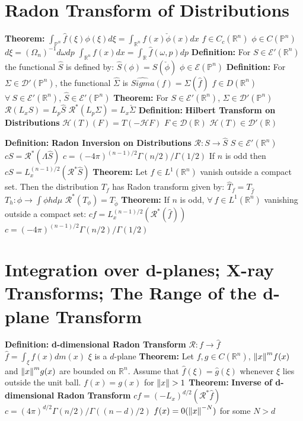 \documentclass[14pt]{extarticle}
\def\Definition{{\color{blue} \textbf{Definition:} }}
\def\Theorem{{\color{red} \textbf{Theorem:} }}
\begin{document}
\begin{outline}
	\section*{Radon Transform of Distributions}
		\1	\Theorem $\int_{\mathbb{P}^n}\hat{f}(\xi)\phi(\xi) d\xi =
				\int_{\mathbb{R}^n} f(x) \check{\phi}(x) dx$
			\2	$f \in C_c(\mathbb{R}^n)$
			\2	$\phi \in C(\mathbb{P}^n)$
			\2	$d\xi = (\Omega_n)^{-1} d\omega dp$ 
			\2	$\int_{\mathbb{R}^n} f(x) dx = \int_{\mathbb{R}} \hat{f}(\omega,p)dp$
		\1	\Definition For $S \in \mathcal{E}'(\mathbb{R}^n)$ the functional
				$\hat{S}$ is defined by:
			\2	$\hat{S}(\phi) = S(\check{\phi})$
				\3	$\phi \in \mathcal{E}(\mathbb{P}^n)$
		\1 \Definition 	For $\Sigma \in \mathcal{D}'(\mathbb{P}^n)$, the functional
				$\hat{\Sigma}$ is
			\2	$\hat{Sigma}(f) = \Sigma(\hat{f})$
				\3	$f \in D(\mathbb{R}^n)$
			\2	$\forall~S \in \mathcal{E}'(\mathbb{R}^n)$, $\hat{S} \in \mathcal{E}'(\mathbb{P}^n)$
		\1	\Theorem For $S \in \mathcal{E}'(\mathbb{R}^n)$, $\Sigma \in \mathcal{D}'(\mathbb{P}^n)$
			\2	$\mathcal{R}(L_xS) = L_p \hat{S}$
			\2	$\mathcal{R}^*(L_p\Sigma) = L_x \check{\Sigma}$
		\1	\Definition \textbf{Hilbert Transform on Distributions}
			\2	$\mathcal{H}(T)(F) = T(-\mathcal{H}F)$
				\3	$F \in \mathcal{D}(\mathbb{R})$
				\3	$\mathcal{H}(T) \in \mathcal{D}'(\mathbb{R})$

		\1	\Definition \textbf{Radon Inversion on Distributions}
			\2	$\mathcal{R} : S \rightarrow \hat{S}$
				\3	$S \in \mathcal{E}'(\mathbb{R}^n)$
			\2	$cS = \mathcal{R}^*(\Lambda \hat{S})$
				\3	$c = (-4\pi)^{(n-1)/2}\Gamma(n/2)/\Gamma(1/2)$
			\2	If $n$ is odd then $cS = L_x^{(n-1)/2}(\mathcal{R}^* \hat{S})$
		\1	\Theorem Let $f \in L^1(\mathbb{R}^n)$ vanish outside a compact set.
				Then the distribution $T_f$ has Radon transform given by:
			\2	$\hat{T}_f = T_{\hat{f}}$
			\2	$T_h : \phi \rightarrow \int \phi h d\mu$
			\2	$\mathcal{R}^*(T_{\phi}) = T_{\check{\phi}}$
		\1	\Theorem If $n$ is odd, $\forall~f \in L^1(\mathbb{R}^n)$ vanishing outside
				a compact set:
			\2	$c f = L_x^{(n-1)/2}(\mathcal{R}^*(\hat{f}))$
				\3	$c = (-4\pi)^{(n-1)/2}\Gamma(n/2)/\Gamma(1/2)$
	
	\section*{Integration over d-planes; X-ray Transforms; The Range of the d-plane Transform}
		\1	\Definition \textbf{d-dimensional Radon Transform}
			\2	$\mathcal{R} : f \rightarrow \hat{f}$
			\2	$\hat{f} = \int_{\xi}f(x) dm(x)$
				\3	$\xi$ is a $d$-plane
		\1	\Theorem	Let $f,g \in C(\mathbb{R}^n)$, $\norm{x}^mf(x)$ and
				$\norm{x}^mg(x)$ are bounded on $\mathbb{R}^n$.  Assume that 
				$\hat{f}(\xi) = \hat{g}(\xi)$ whenever $\xi$ lies outside the
				unit ball.
			\2	$f(x) = g(x)$ for $\norm{x} > 1$
		\1	\Theorem \textbf{Inverse of d-dimensional Radon Transform}
			\2	$cf = (-L_x)^{d/2}(\mathcal{R}^*\hat{f})$
				\3	$c = (4\pi)^{d/2}\Gamma(n/2)/\Gamma((n-d)/2)$
				\3	$f(x) = 0(\norm{x}^{-N})$ for some $N > d$
	

\end{outline}
\end{document}
